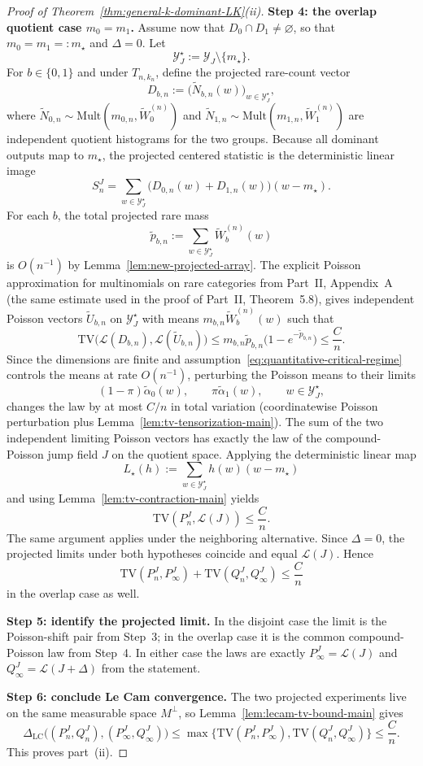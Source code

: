 \documentclass{article}
\newcommand{\TV}{\mathrm{TV}}
\newcommand{\Mult}{\mathrm{Mult}}
\newcommand{\LC}{\Delta_{\mathrm{LC}}}
\newcommand{\1}{\mathbf 1}
\begin{document}
\begin{proof}[Proof of Theorem~\ref{thm:general-k-dominant-LK}(ii)]
\medskip
\textbf{Step 4: the overlap quotient case $m_0=m_1$.}
Assume now that $D_0\cap D_1\neq\varnothing$, so that $m_0=m_1=:m_\star$ and $\Delta=0$.
Let
\[
\mathcal Y_J^\star:=\mathcal Y_J\setminus\{m_\star\}.
\]
For $b\in\{0,1\}$ and under $T_{n,k_n}$, define the projected rare-count vector
\[
D_{b,n}:=\bigl(\widetilde N_{b,n}(w)\bigr)_{w\in \mathcal Y_J^\star},
\]
where $\widetilde N_{0,n}\sim \Mult(m_{0,n},\widetilde W_0^{(n)})$ and
$\widetilde N_{1,n}\sim \Mult(m_{1,n},\widetilde W_1^{(n)})$ are independent quotient histograms for the two groups.
Because all dominant outputs map to $m_\star$, the projected centered statistic is the deterministic linear image
\[
S_n^J=\sum_{w\in\mathcal Y_J^\star} \bigl(D_{0,n}(w)+D_{1,n}(w)\bigr)(w-m_\star).
\]
For each $b$, the total projected rare mass
\[
\widetilde p_{b,n}:=\sum_{w\in\mathcal Y_J^\star}\widetilde W_b^{(n)}(w)
\]
is $O(n^{-1})$ by Lemma~\ref{lem:new-projected-array}. The explicit Poisson approximation for multinomials on
rare categories from Part~II, Appendix~A (the same estimate used in the proof of Part~II, Theorem~5.8), gives
independent Poisson vectors $\widetilde U_{b,n}$ on $\mathcal Y_J^\star$ with means
$m_{b,n}\widetilde W_b^{(n)}(w)$ such that
\[
\TV\bigl(\mathcal L(D_{b,n}),\mathcal L(\widetilde U_{b,n})\bigr)
\le m_{b,n}\widetilde p_{b,n}\bigl(1-e^{-\widetilde p_{b,n}}\bigr)
\le \frac{C}{n}.
\]
Since the dimensions are finite and assumption~\eqref{eq:quantitative-critical-regime} controls the means at rate
$O(n^{-1})$, perturbing the Poisson means to their limits
\[
(1-\pi)\widetilde\alpha_0(w),\qquad \pi\widetilde\alpha_1(w),
\qquad w\in\mathcal Y_J^\star,
\]
changes the law by at most $C/n$ in total variation (coordinatewise Poisson perturbation plus
Lemma~\ref{lem:tv-tensorization-main}). The sum of the two independent limiting Poisson vectors has exactly the law
of the compound-Poisson jump field $J$ on the quotient space. Applying the deterministic linear map
\[
L_\star(h):=\sum_{w\in\mathcal Y_J^\star} h(w)(w-m_\star)
\]
and using Lemma~\ref{lem:tv-contraction-main} yields
\[
\TV(P_n^J,\mathcal L(J))\le \frac{C}{n}.
\]
The same argument applies under the neighboring alternative. Since $\Delta=0$, the projected limits under both
hypotheses coincide and equal $\mathcal L(J)$. Hence
\[
\TV(P_n^J,P_\infty^J)+\TV(Q_n^J,Q_\infty^J)\le \frac{C}{n}
\]
in the overlap case as well.

\medskip
\textbf{Step 5: identify the projected limit.}
In the disjoint case the limit is the Poisson-shift pair from Step~3; in the overlap case it is the common
compound-Poisson law from Step~4. In either case the laws are exactly $P_\infty^J=\mathcal L(J)$ and
$Q_\infty^J=\mathcal L(J+\Delta)$ from the statement.

\medskip
\textbf{Step 6: conclude Le Cam convergence.}
The two projected experiments live on the same measurable space $M^\perp$, so
Lemma~\ref{lem:lecam-tv-bound-main} gives
\[
\LC\bigl((P_n^J,Q_n^J),(P_\infty^J,Q_\infty^J)\bigr)
\le
\max\{\TV(P_n^J,P_\infty^J),\TV(Q_n^J,Q_\infty^J)\}
\le \frac{C}{n}.
\]
This proves part~(ii).
\end{proof}
\end{document}
